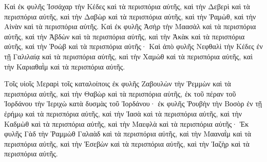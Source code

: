 {Καὶ ἐκ φυλῆς Ἰσσάχαρ τὴν Κέδες καὶ τὰ περισπόρια αὐτῆς, καὶ τὴν Δεβερὶ καὶ τὰ περισπόρια αὐτῆς, καὶ τὴν Δαβὼρ καὶ τὰ περισπόρια αὐτῆς,
καὶ τὴν Ῥαμὼθ, καὶ τὴν Αἰνὰν καὶ τὰ περισπόρια αὐτῆς.
Καὶ ἐκ φυλῆς Ἀσὴρ τὴν Μαασὰλ καὶ τὰ περισπόρια αὐτῆς, καὶ τὴν Ἀβδὼν καὶ τὰ περισπόρια αὐτῆς,
καὶ τὴν Ἀκὰκ καὶ τὰ περισπόρια αὐτῆς, καὶ τὴν Ῥοὼβ καὶ τὰ περισπόρια αὐτῆς·
Καὶ ἀπὸ φυλῆς Νεφθαλὶ τὴν Κέδες ἐν τῇ Γαλιλαίᾳ καὶ τὰ περισπόρια αὐτῆς, καὶ τὴν Χαμὼθ καὶ τὰ περισπόρια αὐτῆς, καὶ τὴν Καριαθαῒμ καὶ τὰ περισπόρια αὐτῆς.
\par }{\PP {}Τοῖς υἱοῖς Μεραρὶ τοῖς καταλοίποις ἐκ φυλῆς Ζαβουλὼν τὴν Ῥεμμὼν καὶ τὰ περισπόρια αὐτῆς, καὶ τὴν Θαβὼρ καὶ τὰ περισπόρια αὐτῆς,
ἐκ τοῦ πέραν τοῦ Ἰορδάνου τὴν Ἱεριχὼ κατὰ δυσμὰς τοῦ Ἰορδάνου· ἐκ φυλῆς Ῥουβὴν τὴν Βοσὸρ ἐν τῇ ἐρήμῳ καὶ τὰ περισπόρια αὐτῆς, καὶ τὴν Ἰασὰ καὶ τὰ περισπόρια αὐτῆς,
καὶ τὴν Καδμὼθ καὶ τὰ περισπόρια αὐτῆς, καὶ τὴν Μαεφλὰ καὶ τὰ περισπόρια αὐτῆς·
Ἐκ φυλῆς Γὰδ τὴν Ῥαμμὼθ Γαλαὰδ καὶ τὰ περισπόρια αὐτῆς, καὶ τὴν Μααναῒμ καὶ τὰ περισπόρια αὐτῆς,
καὶ τὴν Ἐσεβὼν καὶ τὰ περισπόρια αὐτῆς, καὶ τὴν Ἰαζὴρ καὶ τὰ περισπόρια αὐτῆς.

}
